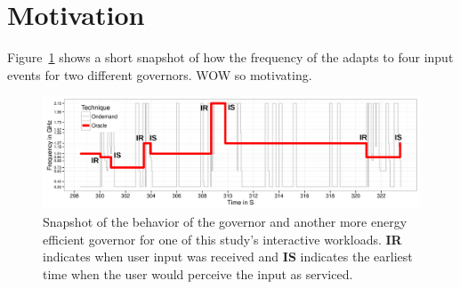 \section{Motivation}
\label{sec:motivation}

Figure~\ref{fig:motivation} shows a short snapshot of how the
frequency of the \Cpu adapts to four input events for two different
\Dvfs governors. WOW so motivating.

\begin{figure}[t!]
  \begin{centering}
    \includegraphics[width=1\columnwidth]{figures/motivation}
    \par
  \end{centering}
  \caption{Snapshot of the behavior of the \Ondemand governor and
	  another more energy efficient governor for one of this study's
	  interactive workloads. \textbf{IR} indicates when user input was
	  received and \textbf{IS} indicates the earliest time when the user
	  would perceive the input as serviced.
  \label{fig:motivation}}
\end{figure}

